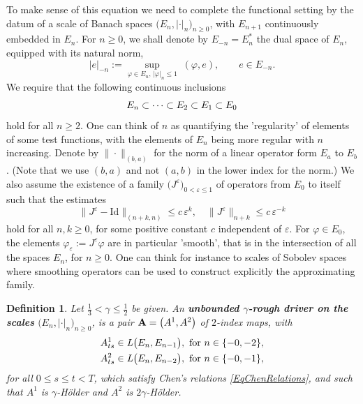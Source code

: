 \documentclass[11pt,a4paper]{amsart}
\renewcommand{\leq}{\leqslant}
\renewcommand{\geq}{\geqslant}
\newcommand{\ssk}{\smallskip}
\newtheorem{defn}[thm]{ \hspace{-0.3cm} {\sc Definition}}%
\numberwithin{equation}{section} %
\begin{document}
To make sense of this equation we need to complete the functional setting by the datum of a scale of Banach spaces $\big(E_n,|\cdot|_n\big)_{n\geq 0}$, with $E_{n+1}$ continuously embedded in $E_n$. For $n\geq 0$, we shall denote by $E_{-n}=E_n^*$ the dual space of $E_n$, equipped with its natural norm, 
$$
|e|_{-n} := \underset{\varphi\in E_n,\,|\varphi|_n\leq 1}{\sup}\; (\varphi,e), \quad\quad e\in E_{-n}.
$$
We require that the following continuous inclusions 
\begin{equation*}
E_n\subset \cdots\subset E_2\subset E_1\subset E_0 \\ 
\end{equation*}
hold for all $n\geq 2$. One can think of $n$ as quantifying the 'regularity' of elements of some test functions, with the elements of $E_n$ being more regular with $n$ increasing. Denote by $\|\cdot\|_{(b,a)}$ for the norm of a linear operator form $E_a$ to $E_b$. (Note that we use $(b,a)$ and not $(a,b)$ in the lower index for the norm.) We also assume the existence of a family $\big(J^\varepsilon\big)_{0<\varepsilon\leq 1}$ of operators from $E_0$ to itself such that the estimates
\begin{equation}
\label{EqApproximationProperties}
\big\|J^\varepsilon - \textrm{Id} \big\|_{(n+k,n)} \leq c\,\varepsilon^k, \quad \big\| J^\varepsilon \big\|_{n + k} \leq c\,\varepsilon^{- k}
\end{equation}
hold for all $n, k \geq 0$, for some positive constant $c$ independent of $\varepsilon$. For $\varphi\in E_0$, the elements $\varphi_\varepsilon := J^\varepsilon\varphi$ are in particular 'smooth', that is in the intersection of all the spaces $E_n$, for $n\geq 0$. One can think for instance to scales of Sobolev spaces where smoothing operators can be used to construct explicitly the approximating family.

\ssk

\begin{defn}
\label{DefnUnboundedRoughDriver}
Let $\frac{1}{3}<\gamma\leq \frac{1}{2}$ be given. An \textbf{\emph{unbounded $\gamma$-rough driver on the scales}} $\big(E_n,|\cdot|_n\big)_{n\geq 0}$, is a pair ${\bf A} = \big(A^1,A^2\big)$ of $2$-index maps, with 
\begin{equation}
\label{EqBoundednessAssumptionRoughDriver}
\begin{split}
&A^1_{ts}\in \textrm{\emph{L}}\big(E_n,E_{n-1}\big), \textrm{ for } n\in\{-0,-2\}, \\
&A^2_{ts}\in\textrm{\emph{L}}\big(E_n,E_{n-2}\big), \textrm{ for } n\in\{-0,-1\},
\end{split}
\end{equation}
for all $0\leq s\leq t<T$, which satisfy Chen's relations \eqref{EqChenRelations}, and such that $A^1$ is $\gamma$-H\"older and $A^2$ is $2\gamma$-H\"older. 
\end{defn}
\end{document}
